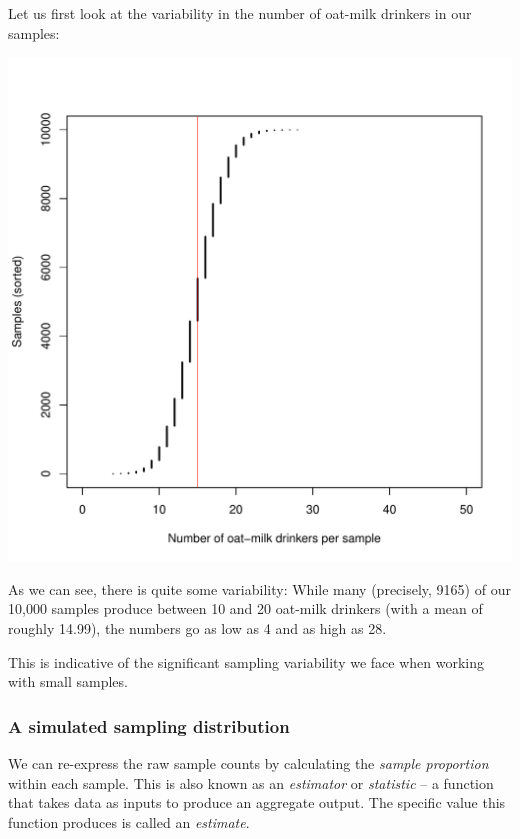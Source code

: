 \documentclass[
  11pt,
]{article}
\begin{document}
Let us first look at the variability in the number of oat-milk drinkers in our samples:

\begin{center}\includegraphics{01-01-lec_files/figure-latex/sim-data-1} \end{center}

As we can see, there is quite some variability: While many (precisely, 9165) of our 10,000 samples produce between 10 and 20 oat-milk drinkers (with a mean of roughly 14.99), the numbers go as low as 4 and as high as 28.

This is indicative of the significant sampling variability we face when working with small samples.

\hypertarget{a-simulated-sampling-distribution}{%
\subsubsection{A simulated sampling distribution}\label{a-simulated-sampling-distribution}}

We can re-express the raw sample counts by calculating the \emph{sample proportion} within each sample. This is also known as an \emph{estimator} or \emph{statistic} -- a function that takes data as inputs to produce an aggregate output. The specific value this function produces is called an \emph{estimate}.
\end{document}
